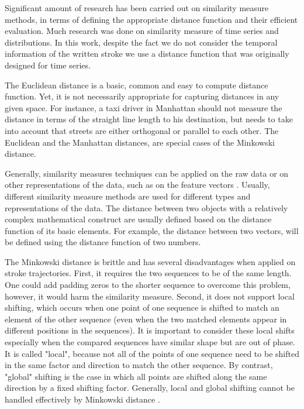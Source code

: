 \iftoggle{edit-mode}{\hspace{0pt}\marginpar{Previous research}}{}
Significant amount of research has been carried out on similarity measure methods, in terms of defining the appropriate distance function and their efficient evaluation. 
Much research was done on similarity measure of time series and distributions. 
In this work, despite the fact we do not consider the temporal information of the written stroke we use a distance function that was originally designed for time series.

\iftoggle{edit-mode}{\hspace{0pt}\marginpar{Euclidean and Manhattan}}{}
The Euclidean distance is a basic, common and easy to compute distance function. 
Yet, it is not necessarily appropriate for capturing distances in any given space. 
For instance, a taxi driver in Manhattan should not measure the distance in terms of the straight line length to his destination, but needs to take into account that streets are either orthogonal or parallel to each other.
The Euclidean and the Manhattan distances, are special cases of the Minkowski distance.

\iftoggle{edit-mode}{\hspace{0pt}\marginpar{Different Representations}}{}
Generally, similarity measures techniques can be applied on the raw data or on other representations of the data, such as on the feature vectors \cite{chen2005similarity}. 
Usually, different similarity measure methods are used for different types and representations of the data. 
The distance between two objects with a relatively complex mathematical construct are usually defined based on the distance function of its basic elements. 
For example, the distance between two vectors, will be defined using the distance function of two numbers. 

\iftoggle{edit-mode}{\hspace{0pt}\marginpar{Drawbacks of the Minkowski distance}}{}
The Minkowski distance is brittle and has several disadvantages when applied on stroke trajectories.
First, it requires the two sequences to be of the same length. 
One could add padding zeros to the shorter sequence to overcome this problem, however, it would harm the similarity measure. 
Second, it does not support local shifting, which occurs when one point of one sequence is shifted to match an element of the other sequence (even when the two matched elements appear in different positions in the sequences). 
It is important to consider these local shifts especially when the compared sequences have similar shape but are out of phase. 
It is called "local", because not all of the points of one sequence need to be shifted in the same factor and direction to match the other sequence. 
By contrast, "global" shifting is the case in which all points are shifted along the same direction by a fixed shifting factor. 
Generally, local and global shifting cannot be handled effectively by Minkowski distance \cite{chen2005similarity}.

